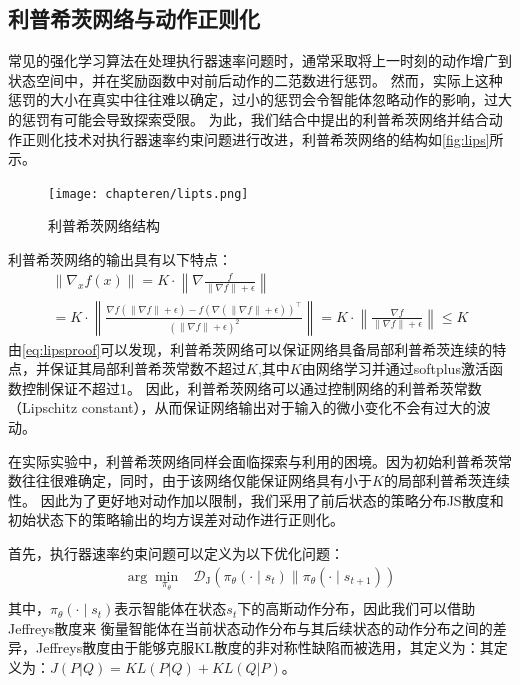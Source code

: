 \subsection{利普希茨网络与动作正则化}
常见的强化学习算法在处理执行器速率问题时，通常采取将上一时刻的动作增广到状态空间中，并在奖励函数中对前后动作的二范数进行惩罚\cite{kaufmann2023champion}。
然而，实际上这种惩罚的大小在真实中往往难以确定，过小的惩罚会令智能体忽略动作的影响，过大的惩罚有可能会导致探索受限。
为此，我们结合\parencite{song2023lipsnet}中提出的利普希茨网络并结合动作正则化技术对执行器速率约束问题进行改进，利普希茨网络的结构如\autoref{fig:lips}所示。
\begin{figure}[htbp]
    \centering
    \texttt{[image: chapteren/lipts.png]}
    \caption{\label{fig:lips}利普希茨网络结构}
\end{figure}

利普希茨网络的输出具有以下特点：
\begin{align}
    \label{eq:lipsproof}
    \left\|\nabla_{x} f(x)\right\|=K \cdot\left\|\nabla \frac{f}{\|\nabla f\|+\epsilon}\right\| \\
    =K \cdot\left\|\frac{\nabla f(\|\nabla f\|+\epsilon)-f(\nabla(\|\nabla f\|+\epsilon))^{\top}}{(\|\nabla f\|+\epsilon)^{2}}\right\|=K \cdot\left\|\frac{\nabla f}{\|\nabla f\|+\epsilon}\right\| \leq K
\end{align}
由\autoref{eq:lipsproof}可以发现，利普希茨网络可以保证网络具备局部利普希茨连续的特点，并保证其局部利普希茨常数不超过$K$,其中$K$由网络学习并通过softplus激活函数控制保证不超过1。
因此，利普希茨网络可以通过控制网络的利普希茨常数（Lipschitz constant），从而保证网络输出对于输入的微小变化不会有过大的波动。

在实际实验中，利普希茨网络同样会面临探索与利用的困境。因为初始利普希茨常数往往很难确定，同时，由于该网络仅能保证网络具有小于$K$的局部利普希茨连续性。
因此为了更好地对动作加以限制，我们采用了前后状态的策略分布JS散度和初始状态下的策略输出的均方误差对动作进行正则化。

首先，执行器速率约束问题可以定义为以下优化问题：
\begin{align}
    \arg \min _{\pi_{\theta}}&\mathcal{D}_{\mathrm{J}}\left(\pi_{\theta}(\cdot \mid s_{t}) \| \pi_{\theta}(\cdot \mid s_{t+1})\right)\\
\end{align}
其中，$\pi_{\theta}(\cdot \mid s_{t})$表示智能体在状态$s_{t}$下的高斯动作分布，因此我们可以借助Jeffreys散度来
衡量智能体在当前状态动作分布与其后续状态的动作分布之间的差异，Jeffreys散度由于能够克服KL散度的非对称性缺陷而被选用，其定义为：其定义为：$J(P|Q) = KL(P|Q)+KL(Q|P)$。


